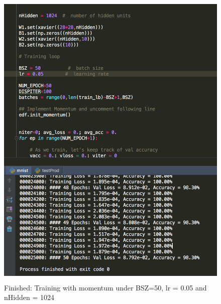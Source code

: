\documentclass{article}
\begin{document}
\begin{figure}[h!]
  \centering
	\includegraphics[height=40em]{screenshots/prob2(b)50-005-1024-3.png}
	\caption{Finished: Training with momentum under BSZ=50, lr = 0.05 and nHidden = 1024}
\end{figure}
\end{document}
